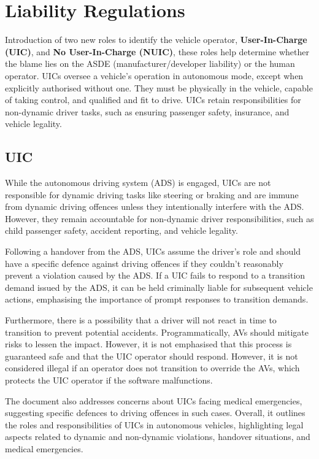 \documentclass[12pt]{report} %
\begin{document}
		\section{Liability Regulations}
			Introduction of two new roles to identify the vehicle operator, \textbf{User-In-Charge (UIC)}, and \textbf{No User-In-Charge (NUIC)}, these roles help determine whether the blame lies on the ASDE (manufacturer/developer liability) or the human operator. UICs oversee a vehicle's operation in autonomous mode, except when explicitly authorised without one. They must be physically in the vehicle, capable of taking control, and qualified and fit to drive. UICs retain responsibilities for non-dynamic driver tasks, such as ensuring passenger safety, insurance, and vehicle legality.

			\subsection*{UIC}
				While the autonomous driving system (ADS) is engaged, UICs are not responsible for dynamic driving tasks like steering or braking and are immune from dynamic driving offences unless they intentionally interfere with the ADS. However, they remain accountable for non-dynamic driver responsibilities, such as child passenger safety, accident reporting, and vehicle legality.

				Following a handover from the ADS, UICs assume the driver's role and should have a specific defence against driving offences if they couldn't reasonably prevent a violation caused by the ADS. If a UIC fails to respond to a transition demand issued by the ADS, it can be held criminally liable for subsequent vehicle actions, emphasising the importance of prompt responses to transition demands.
				
				Furthermore, there is a possibility that a driver will not react in time to transition to prevent potential accidents. Programmatically, AVs should mitigate risks to lessen the impact. However, it is not emphasised that this process is guaranteed safe and that the UIC operator should respond. However, it is not considered illegal if an operator does not transition to override the AVs, which protects the UIC operator if the software malfunctions.

				The document also addresses concerns about UICs facing medical emergencies, suggesting specific defences to driving offences in such cases. Overall, it outlines the roles and responsibilities of UICs in autonomous vehicles, highlighting legal aspects related to dynamic and non-dynamic violations, handover situations, and medical emergencies.
\end{document}
